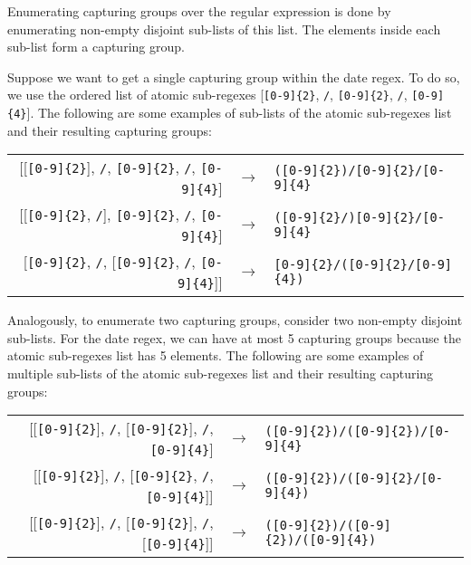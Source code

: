 Enumerating capturing groups over the regular expression is done by enumerating non-empty disjoint sub-lists of this list. The elements inside each sub-list form a capturing group.

\begin{example}
Suppose we want to get a single capturing group within the date regex. %
To do so, we use the ordered list of atomic sub-regexes [\verb![0-9]{2}!, \verb!/!, \verb![0-9]{2}!, \verb!/!, \verb![0-9]{4}!].
The following are some examples of sub-lists of the atomic sub-regexes list and their resulting capturing groups:

\begin{center}
\setlength{\extrarowheight}{10pt}
\begin{tabular}{rcl}
[[\verb![0-9]{2}!], \verb!/!, \verb![0-9]{2}!, \verb!/!, \verb![0-9]{4}!] & $\rightarrow$ & \verb!([0-9]{2})/[0-9]{2}/[0-9]{4}! \\

[[\verb![0-9]{2}!, \verb!/!], \verb![0-9]{2}!, \verb!/!, \verb![0-9]{4}!] & $\rightarrow$ & \verb!([0-9]{2}/)[0-9]{2}/[0-9]{4}! \\

[\verb![0-9]{2}!, \verb!/!, [\verb![0-9]{2}!, \verb!/!, \verb![0-9]{4}!]] & $\rightarrow$ & \verb![0-9]{2}/([0-9]{2}/[0-9]{4})!
\end{tabular}\bigskip
\end{center}

\noindent
Analogously, to enumerate two capturing groups, consider two non-empty disjoint sub-lists. For the date regex, we can have at most 5 capturing groups because the atomic sub-regexes list has 5 elements. The following are some examples of multiple sub-lists of the atomic sub-regexes list and their resulting capturing groups:

\begin{center}
\setlength{\extrarowheight}{10pt}
\begin{tabular}{rcl}
[[\verb![0-9]{2}!], \verb!/!, [\verb![0-9]{2}!], \verb!/!, \verb![0-9]{4}!] & $\rightarrow$ & \verb!([0-9]{2})/([0-9]{2})/[0-9]{4}! \\

[[\verb![0-9]{2}!], \verb!/!, [\verb![0-9]{2}!, \verb!/!, \verb![0-9]{4}!]] & $\rightarrow$ & \verb!([0-9]{2})/([0-9]{2}/[0-9]{4})! \\

[[\verb![0-9]{2}!], \verb!/!, [\verb![0-9]{2}!], \verb!/!, [\verb![0-9]{4}!]] & $\rightarrow$ & \verb!([0-9]{2})/([0-9]{2})/([0-9]{4})!
\end{tabular}\bigskip
\end{center}
\end{example}

